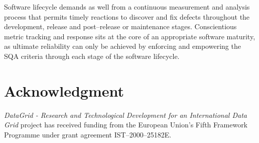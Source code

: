 \documentclass[journal]{IEEEtran}
\begin{document}
Software lifecycle demands as well from a continuous measurement and analysis
process that permits timely reactions to discover and fix defects throughout the
development, release and post--release or maintenance stages. Conscientious metric
tracking and response sits at the core of an appropriate software maturity, as
ultimate reliability can only be achieved by enforcing and empowering the SQA
criteria through each stage of the software lifecycle.

\section*{Acknowledgment}


{\sl DataGrid - Research and Technological Development for an International Data Grid} project has received funding from the European Union's Fifth Framework Programme under grant agreement IST--2000--25182E.
\end{document}
